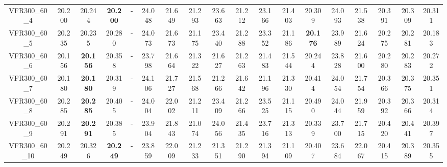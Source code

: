 \begin{tabular}{cc|ccc|ccccccccccccc}
VFR300\_60\_4      & 20.200           & 20.244           & {\bf 20.200}     & -                & 24.048           & 21.649           & 21.293           & 23.663           & 21.212           & 23.166           & 21.403           & 20.309           & 24.093           & 21.538           & 20.391           & 20.309           & 20.311          \\ 
VFR300\_60\_5      & 20.235           & 20.235           & 20.280           & -                & 24.073           & 21.673           & 21.175           & 23.440           & 21.288           & 23.352           & 21.186           & {\bf 20.176}     & 23.989           & 21.624           & 20.275           & 20.281           & 20.183          \\ 
VFR300\_60\_6      & 20.156           & {\bf 20.156}     & 20.358           & -                & 23.798           & 21.664           & 21.322           & 21.627           & 21.263           & 21.483           & 21.544           & 20.244           & 23.828           & 21.600           & 20.280           & 20.283           & 20.272          \\ 
VFR300\_60\_7      & 20.180           & {\bf 20.180}     & 20.319           & -                & 24.106           & 21.727           & 21.568           & 21.266           & 21.642           & 21.196           & 21.330           & 20.414           & 24.054           & 21.754           & 20.366           & 20.375           & 20.351          \\ 
VFR300\_60\_8      & 20.285           & {\bf 20.285}     & 20.405           & -                & 24.004           & 22.002           & 21.211           & 23.409           & 21.266           & 23.525           & 21.115           & 20.490           & 24.044           & 21.959           & 20.392           & 20.366           & 20.314          \\ 
VFR300\_60\_9      & 20.291           & {\bf 20.291}     & 20.385           & -                & 23.904           & 21.843           & 21.074           & 24.056           & 21.435           & 23.716           & 21.313           & 20.339           & 23.700           & 21.715           & 20.420           & 20.441           & 20.397          \\ 
VFR300\_60\_10     & 20.249           & 20.326           & {\bf 20.249}     & -                & 23.859           & 22.009           & 21.233           & 21.351           & 21.290           & 21.394           & 21.109           & 20.407           & 23.684           & 22.067           & 20.415           & 20.389           & 20.355          \\ 

\end{tabular}
